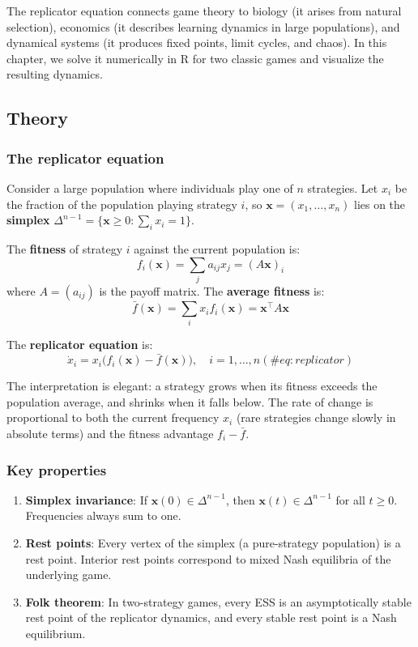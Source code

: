 \documentclass[
]{article}
\providecommand{\tightlist}{%
  \setlength{\itemsep}{0pt}\setlength{\parskip}{0pt}}
\begin{document}
The replicator equation connects game theory to biology (it arises from
natural selection), economics (it describes learning dynamics in large
populations), and dynamical systems (it produces fixed points, limit
cycles, and chaos). In this chapter, we solve it numerically in R for
two classic games and visualize the resulting dynamics.

\subsection{Theory}\label{theory}

\subsubsection{The replicator equation}\label{the-replicator-equation}

Consider a large population where individuals play one of \(n\)
strategies. Let \(x_i\) be the fraction of the population playing
strategy \(i\), so \(\mathbf{x} = (x_1, \ldots, x_n)\) lies on the
\textbf{simplex}
\(\Delta^{n-1} = \{ \mathbf{x} \geq 0 : \sum_i x_i = 1 \}\).

The \textbf{fitness} of strategy \(i\) against the current population
is: \[
f_i(\mathbf{x}) = \sum_j a_{ij} x_j = (A\mathbf{x})_i
\] where \(A = (a_{ij})\) is the payoff matrix. The \textbf{average
fitness} is: \[
\bar{f}(\mathbf{x}) = \sum_i x_i f_i(\mathbf{x}) = \mathbf{x}^\top A \mathbf{x}
\]

The \textbf{replicator equation} is: \begin{equation}
\dot{x}_i = x_i \bigl( f_i(\mathbf{x}) - \bar{f}(\mathbf{x}) \bigr), \quad i = 1, \ldots, n
(\#eq:replicator)
\end{equation}

The interpretation is elegant: a strategy grows when its fitness exceeds
the population average, and shrinks when it falls below. The rate of
change is proportional to both the current frequency \(x_i\) (rare
strategies change slowly in absolute terms) and the fitness advantage
\(f_i - \bar{f}\).

\subsubsection{Key properties}\label{key-properties}

\begin{enumerate}
\def\labelenumi{\arabic{enumi}.}
\tightlist
\item
  \textbf{Simplex invariance}: If \(\mathbf{x}(0) \in \Delta^{n-1}\),
  then \(\mathbf{x}(t) \in \Delta^{n-1}\) for all \(t \geq 0\).
  Frequencies always sum to one.
\item
  \textbf{Rest points}: Every vertex of the simplex (a pure-strategy
  population) is a rest point. Interior rest points correspond to mixed
  Nash equilibria of the underlying game.
\item
  \textbf{Folk theorem}: In two-strategy games, every ESS is an
  asymptotically stable rest point of the replicator dynamics, and every
  stable rest point is a Nash equilibrium.
\end{enumerate}
\end{document}
